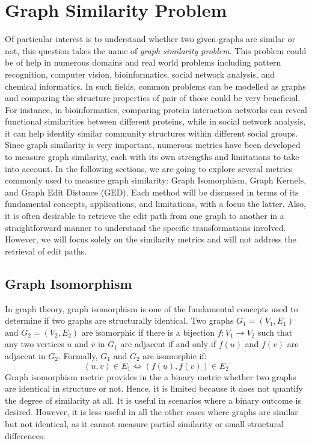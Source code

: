 \documentclass[../Thesis.tex]{subfiles}
\begin{document}
	
	\section{Graph Similarity Problem}
	\label{sec:graph_similarity_problem}
	
	Of particular interest is to understand whether two given graphs are similar or not, this question takes the name of \emph{graph similarity problem}. This problem could be of help in numerous domains and real world problems including  pattern recognition, computer vision, bioinformatics, social network analysis, and chemical informatics. In such fields, common problems can be modelled as graphs and comparing the structure properties of pair of those could be very beneficial. For instance, in bioinformatics, comparing protein interaction networks can reveal functional similarities between different proteins, while in social network analysis, it can help identify similar community structures within different social groups. Since graph similarity is very important, numerous metrics have been developed to measure graph similarity, each with its own strengths and limitations to take into account. In the following sections, we are going to explore several metrics commonly used to measure graph similarity: Graph Isomorphism, Graph Kernels, and Graph Edit Distance (GED). Each method will be discussed in terms of its fundamental concepts, applications, and limitations, with a focus the latter. Also, it is often desirable to retrieve the edit path from one graph to another in a straightforward manner to understand the specific transformations involved. However, we will focus solely on the similarity metrics and will not address the retrieval of edit paths.
	
	\subsection{Graph Isomorphism}
	
	In graph theory, graph isomorphism is one of the fundamental concepts used to determine if two graphs are structurally identical. Two graphs $G_1 = (V_1, E_1)$ and $G_2 = (V_2, E_2)$ are isomorphic if there is a bijection $f: V_1 \to V_2$ such that any two vertices $u$ and $v$ in $G_1$ are adjacent if and only if $f(u)$ and $f(v)$ are adjacent in $G_2$. Formally, $G_1$ and $G_2$ are isomorphic if:
	\[
	(u, v) \in E_1 \Leftrightarrow (f(u), f(v)) \in E_2
	\]
	Graph isomorphism metric provides in the a binary metric whether two graphs are identical in structure or not. Hence, it is limited because it does not quantify the degree of similarity at all. It is useful in scenarios where a binary outcome is desired. However, it is less useful in all the other cases where graphs are similar but not identical, as it cannot measure partial similarity or small structural differences.
\end{document}
